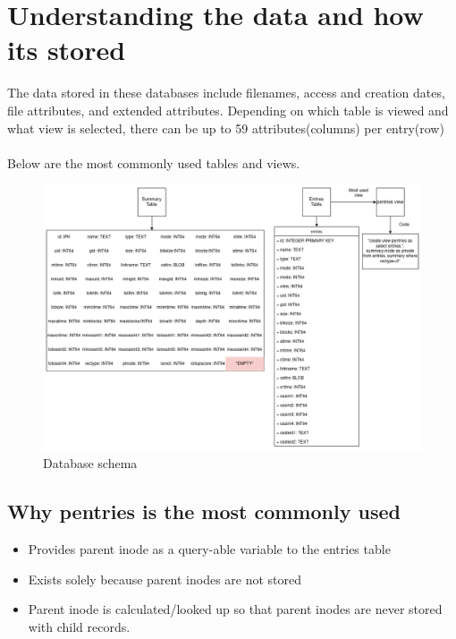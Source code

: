 \section{Understanding the data and how its stored}
The data stored in these databases include filenames, access and creation dates, file attributes, and extended attributes. Depending on which table is viewed and what view is selected, there can be up to 59 attributes(columns) per entry(row)\\
\\
Below are the most commonly used tables and views. 

\begin{figure} [h]
\centering
\includegraphics[width=1.0\textwidth]{images/Database_Schemas.png}
\caption{\label{fig:Database Schema}Database schema}
\end{figure}

\subsection{Why pentries is the most commonly used}
\begin{itemize}
  \item Provides parent inode as a query-able variable to the entries table
  \item Exists solely because parent inodes are not stored
  \item Parent inode is calculated/looked up so that parent inodes are never stored with child records.
\end{itemize}